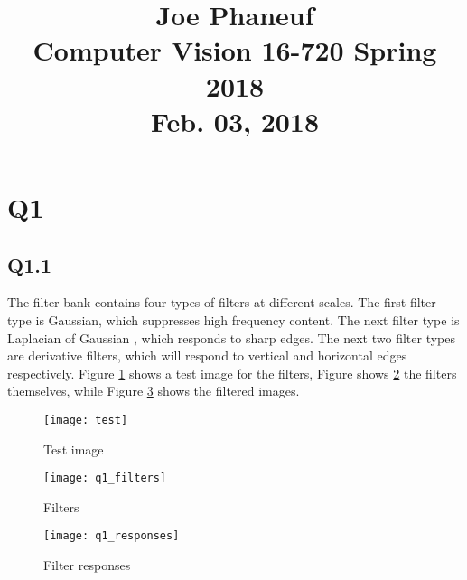 \documentclass[12pt]{article}
\begin{document}
\title{Joe Phaneuf \\ Computer Vision 16-720 Spring 2018 \\ Feb. 03, 2018 }
\date{}
\author{}
\maketitle

\newpage


\section{Q1}
\subsection{Q1.1}

The filter bank contains four types of filters at different scales. The first filter type is Gaussian, which suppresses high frequency content. The next filter type is Laplacian of Gaussian , which responds to sharp edges. The next two filter types are derivative filters, which will respond to vertical and horizontal edges respectively.
Figure \ref{fig:test_image} shows a test image for the filters, Figure shows \ref{fig:filters} the filters themselves, while Figure \ref{fig:filter_responses} shows the filtered images.

\begin{figure}[H]
\centering
\texttt{[image: test]}
\caption{Test image}    
\label{fig:test_image}
\end{figure}   

\begin{figure}[H]
\centering
\texttt{[image: q1\_filters]}
\caption{Filters}    
\label{fig:filters}
\end{figure}   

\begin{figure}[H]
\centering
\texttt{[image: q1\_responses]}
\caption{Filter responses}    
\label{fig:filter_responses}
\end{figure}   

\newpage
\end{document}
